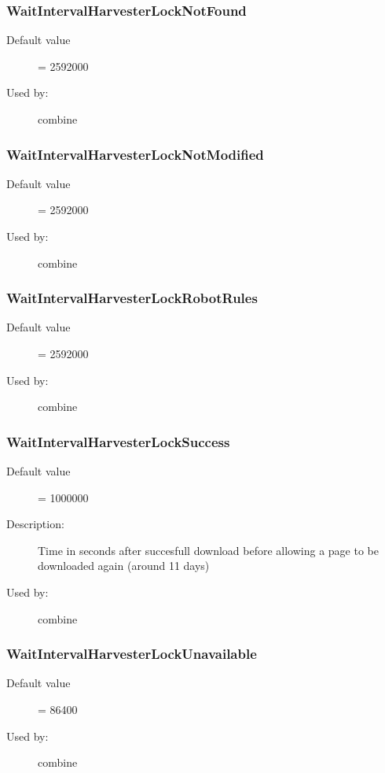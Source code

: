 \subsubsection{WaitIntervalHarvesterLockNotFound}
\label{WaitIntervalHarvesterLockNotFound}
\begin{description}
\item[Default value] = 2592000
\item[Used by:] combine
\end{description}
\subsubsection{WaitIntervalHarvesterLockNotModified}
\label{WaitIntervalHarvesterLockNotModified}
\begin{description}
\item[Default value] = 2592000
\item[Used by:] combine
\end{description}
\subsubsection{WaitIntervalHarvesterLockRobotRules}
\label{WaitIntervalHarvesterLockRobotRules}
\begin{description}
\item[Default value] = 2592000
\item[Used by:] combine
\end{description}
\subsubsection{WaitIntervalHarvesterLockSuccess}
\label{WaitIntervalHarvesterLockSuccess}
\begin{description}
\item[Default value] = 1000000
\item[Description:] Time in seconds after succesfull download before allowing a page to be downloaded again (around 11 days)
\item[Used by:] combine
\end{description}
\subsubsection{WaitIntervalHarvesterLockUnavailable}
\label{WaitIntervalHarvesterLockUnavailable}
\begin{description}
\item[Default value] = 86400
\item[Used by:] combine
\end{description}
